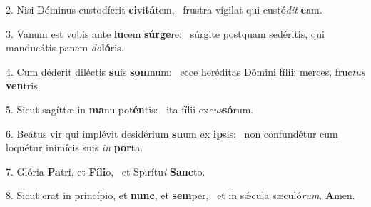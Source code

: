 2. Nisi Dóminus custodíerit \textbf{ci}vi\textbf{tá}tem, \ast\  frustra vígilat qui custó\textit{dit} \textbf{e}am.\

3. Vanum est vobis ante \textbf{lu}cem \textbf{súr}\textbf{ge}re: \ast\  súrgite postquam sedéritis, qui manducátis panem \textit{do}\textbf{ló}ris.\

4. Cum déderit diléctis \textbf{su}is \textbf{som}num: \ast\  ecce heréditas Dómini fílii: merces, fruc\textit{tus} \textbf{ven}tris.\

5. Sicut sagíttæ in \textbf{ma}nu pot\textbf{én}tis: \ast\  ita fílii ex\textit{cus}\textbf{só}rum.\

6. Beátus vir qui implévit desidérium \textbf{su}um ex \textbf{ip}sis: \ast\  non confundétur cum loquétur inimícis suis \textit{in} \textbf{por}ta.\

7. Glória \textbf{Pa}tri, et \textbf{Fí}\textbf{li}o, \ast\  et Spirítu\textit{i} \textbf{Sanc}to.\

8. Sicut erat in princípio, et \textbf{nunc}, et \textbf{sem}per, \ast\  et in sǽcula sæculó\textit{rum}. \textbf{A}men.\

